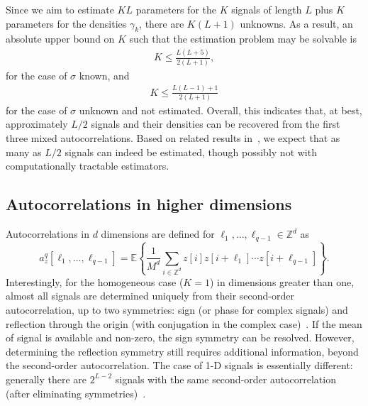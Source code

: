 \documentclass[12pt]{article}
\newcommand{\E}{\mathbb{E}}
\newcommand{\1}{\mathbf{1}}
\theoremstyle{plain}
\theoremstyle{definition}
\theoremstyle{remark}
\theoremstyle{plain}
\theoremstyle{remark}
\theoremstyle{plain}
\theoremstyle{plain}
\theoremstyle{plain}
\numberwithin{equation}{section}
\begin{document}
Since we aim to estimate $KL$ parameters for the $K$ signals of length $L$ plus $K$ parameters for the densities $\gamma_k$, %
 there are $K(L+1)$ unknowns. As a result, an absolute upper bound on $K$ such that the estimation problem may be solvable is
\begin{align*}
	K \leq \frac{L(L+5)}{2(L+1)},
\end{align*}
for the case of $\sigma$ known, and
\begin{align*}
	K \leq \frac{ L (L-1) + 1}{2(L+1)}
\end{align*}
for the case of $\sigma$ unknown and not estimated. Overall, this indicates that, at best, approximately $L/2$ signals and their densities can be recovered from the first three mixed autocorrelations. Based on related results in~\cite{bandeira2017estimation}, we expect that as many as $L/2$ signals can indeed be estimated, though possibly not with computationally tractable estimators.



\subsection{Autocorrelations in higher dimensions} \label{sec:high_dimensions}

Autocorrelations in $d$ dimensions are defined for  $\ell_1,\ldots,\ell_{q-1}\in\mathbb{Z}^d$  as 
\begin{equation}
a_z^q[\ell_1,\ldots,\ell_{q-1}]   = \E\left\{\frac{1}{M^d} \sum_{i\in\mathbb{Z}^d} z[i]z[i+\ell_1]\cdots z[i+\ell_{q-1}]\right\}.
\label{eq:ac_d_dimension}
\end{equation}
Interestingly, for the homogeneous case ($K=1$) in dimensions greater than one, almost all  signals are determined uniquely from their second-order autocorrelation, up to two symmetries: sign (or phase for complex signals) and reflection through the origin (with conjugation in the complex case)~\cite{hayes1982reconstruction}. 
If the mean of signal is available and non-zero, the sign symmetry can be resolved. However, determining the reflection symmetry still requires additional information, beyond the second-order autocorrelation.
The case of 1-D signals is essentially different: generally there are $2^{L-2}$ signals with the same second-order autocorrelation (after eliminating  symmetries)~\cite{beinert2015ambiguities,bendory2017fourier}. 
\end{document}
